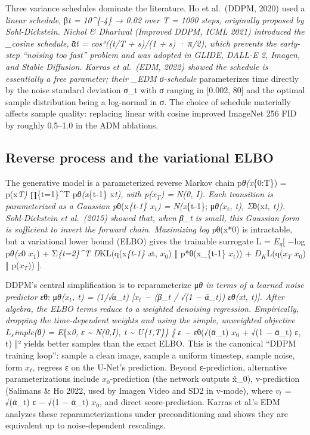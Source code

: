\documentclass{article}
\begin{document}
Three variance schedules dominate the literature. Ho et al.~(DDPM, 2020) used a \emph{linear schedule}, β\emph{t = 10\^{}\{-4\} → 0.02 over T = 1000 steps, originally proposed by Sohl-Dickstein. Nichol \& Dhariwal (Improved DDPM, ICML 2021) introduced the \_cosine schedule}, ᾱ\emph{t = cos²((t/T + s)/(1 + s) · π/2), which prevents the early-step ``noising too fast'' problem and was adopted in GLIDE, DALL-E 2, Imagen, and Stable Diffusion. Karras et al.~(EDM, 2022) showed the schedule is essentially a free parameter; their \_EDM σ-schedule} parameterizes time directly by the noise standard deviation σ\_t with σ ranging in {[}0.002, 80{]} and the optimal sample distribution being a log-normal in σ. The choice of schedule materially affects sample quality: replacing linear with cosine improved ImageNet 256 FID by roughly 0.5--1.0 in the ADM ablations.

\subsection{Reverse process and the variational ELBO}\label{reverse-process-and-the-variational-elbo}

The generative model is a parameterized reverse Markov chain p\emph{θ(x}\{0:T\}) = p(x\emph{T) ∏}\{t=1\}\^{}T p\emph{θ(x}\{t-1\} \textbar{} x\emph{t), with p(\(x_T\)) = N(0, I). Each transition is parameterized as a Gaussian p}θ(x\emph{\{t-1\} \textbar{} \(x_t\)) = N(x}\{t-1\}; μ\emph{θ(\(x_t\), t), Σ}θ(x\emph{t, t)). Sohl-Dickstein et al.~(2015) showed that, when β\_t is small, this Gaussian form is sufficient to invert the forward chain. Maximizing log p}θ(x*0) is intractable, but a variational lower bound (ELBO) gives the trainable surrogate L = \(E_q\){[} −log p\emph{θ(x}0 \textbar{} \(x_1\)) + Σ\emph{\{t=2\}\^{}T D}KL(q(x\emph{\{t-1\} \textbar{} x}t, \(x_0\)) ‖ p*θ(x\_\{t-1\} \textbar{} \(x_t\))) + \(D_K\)L(q(\(x_T\) \textbar{} \(x_0\)) ‖ p(\(x_T\))) {]}.

DDPM's central simplification is to reparameterize μ\emph{θ in terms of a learned noise predictor ε}θ: μ\emph{θ(\(x_t\), t) = (1/√α\_t) {[}\(x_t\) − (β\_t / √(1 − ᾱ\_t)) ε\emph{θ(x}t, t){]}. After algebra, the ELBO terms reduce to a weighted denoising regression. Empirically, dropping the time-dependent weights and using the simple, unweighted objective \(L_s\)imple(θ) = E}\{x\emph{0, ε \textasciitilde{} N(0,I), t \textasciitilde{} U\{1,T\}\} ‖ ε − ε}θ(√(ᾱ\_t) \(x_0\) + √(1 − ᾱ\_t) ε, t) ‖² yields better samples than the exact ELBO. This is the canonical ``DDPM training loop'': sample a clean image, sample a uniform timestep, sample noise, form \(x_t\), regress ε on the U-Net's prediction. Beyond ε-prediction, alternative parameterizations include \(x_0\)-prediction (the network outputs x̂\_0), v-prediction (Salimans \& Ho 2022, used by Imagen Video and SD2 in v-mode), where \(v_t\) = √(ᾱ\_t) ε − √(1 − ᾱ\_t) \(x_0\), and direct score-prediction. Karras et al.'s EDM analyzes these reparameterizations under preconditioning and shows they are equivalent up to noise-dependent rescalings.
\end{document}
